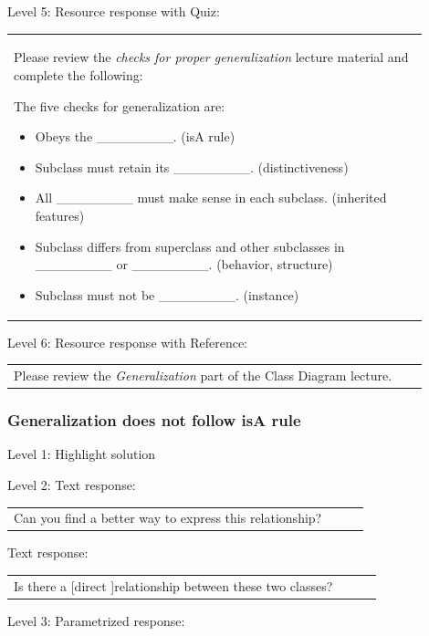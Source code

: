 \noindent Level 5: Resource response with Quiz: \medskip

\begin{tabular}{|p{0.9\linewidth}}
Please review the \textit{checks for proper generalization} lecture material
and complete the following:

The five checks for generalization are:
\begin{itemize}
    \item Obeys the \_\_\_\_\_\_\_\_. (isA rule)
    \item Subclass must retain its \_\_\_\_\_\_\_\_. (distinctiveness)
    \item All \_\_\_\_\_\_\_\_ must make sense in each subclass. (inherited features)
    \item Subclass differs from superclass and other subclasses in \_\_\_\_\_\_\_\_ or \_\_\_\_\_\_\_\_. (behavior, structure)
    \item Subclass must not be \_\_\_\_\_\_\_\_. (instance)
\end{itemize}

\end{tabular} \medskip

\noindent Level 6: Resource response with Reference: \medskip

\begin{tabular}{|p{0.9\linewidth}}
Please review the \textit{Generalization} part of the Class Diagram lecture.
\end{tabular} \medskip


\subsubsection{Generalization does not follow isA rule}

\noindent Level 1: Highlight solution  \medskip

\noindent Level 2: Text response: \medskip

\begin{tabular}{|p{0.9\linewidth}}
Can you find a better way to express this relationship?
\end{tabular} \medskip

Text response: \medskip

\begin{tabular}{|p{0.9\linewidth}}
Is there a [direct ]relationship between these two classes?
\end{tabular} \medskip

\noindent Level 3: Parametrized response: \medskip

